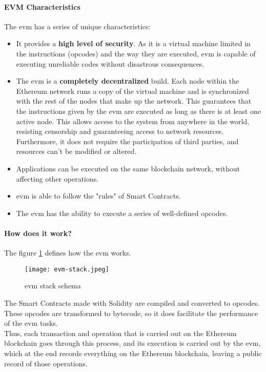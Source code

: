\paragraph{EVM Characteristics}
The \acrshort{evm} has a series of unique characteristics\cite{ethereumGavin,ethereumDocu}:
\begin{itemize}
    \item It provides a \textbf{high level of security}. As it is a virtual machine limited in the instructions (opcodes) and the way they are executed, \acrshort{evm} is capable of executing unreliable codes without disastrous consequences.
    \item The \acrshort{evm} is a \textbf{completely decentralized} build. Each node within the Ethereum network runs a copy of the virtual machine and is synchronized with the rest of the nodes that make up the network. This guarantees that the instructions given by the \acrshort{evm} are executed as long as there is at least one active node. This allows access to the system from anywhere in the world, resisting censorship and guaranteeing access to network resources. Furthermore, it does not require the participation of third parties, and resources can't be modified or altered.
    \item Applications can be executed on the same blockchain network, without affecting other operations.
    \item \acrshort{evm} is able to follow the "rules" of Smart Contracts.
    \item The \acrshort{evm} has the ability to execute a series of well-defined opcodes.
\end{itemize}

\paragraph{How does it work?}
The figure \ref{fig:blockchain_stack} defines how the \acrshort{evm} works\cite{queEsEvm}.
\begin{figure}[h]
    \centering
    \texttt{[image: evm-stack.jpeg]}
    \caption{\acrshort{evm} stack schema}
    \label{fig:blockchain_stack}
\end{figure}

The Smart Contracts made with Solidity are compiled and converted to opcodes. These opcodes are transformed to bytecode, so it does facilitate the performance of the \acrshort{evm} tasks.\\

Thus, each transaction and operation that is carried out on the Ethereum blockchain goes through this process, and its execution is carried out by the \acrshort{evm}, which at the end records everything on the Ethereum blockchain, leaving a public record of those operations.

